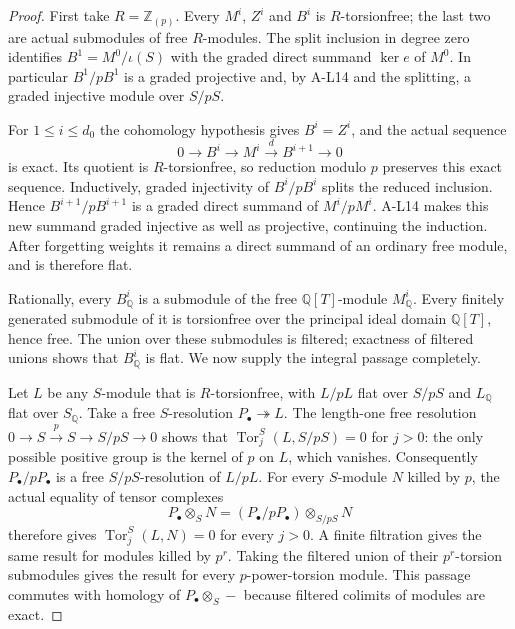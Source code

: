 \begin{proof}
First take $R=\mathbb Z_{(p)}$. Every $M^i$, $Z^i$
and $B^i$ is $R$-torsionfree; the last two are actual
submodules of free $R$-modules. The split inclusion in
degree zero identifies $B^1=M^0/\iota(S)$ with the
graded direct summand $\ker e$ of $M^0$. In particular
$B^1/pB^1$ is a graded projective and, by A-L14 and
the splitting, a graded injective module over $S/pS$.

For $1\leq i\leq d_0$ the cohomology hypothesis gives
$B^i=Z^i$, and the actual sequence
\[
 0\longrightarrow B^i\longrightarrow M^i
       \xrightarrow{d} B^{i+1}\longrightarrow0
 \tag{AL.81}
\]
is exact. Its quotient is $R$-torsionfree, so reduction
modulo $p$ preserves this exact sequence. Inductively,
graded injectivity of $B^i/pB^i$ splits the reduced
inclusion. Hence $B^{i+1}/pB^{i+1}$ is a graded direct
summand of $M^i/pM^i$. A-L14 makes this new summand
graded injective as well as projective, continuing the
induction. After forgetting weights it remains a direct
summand of an ordinary free module, and is therefore flat.

Rationally, every $B^i_{\mathbb Q}$ is a submodule of
the free $\mathbb Q[T]$-module $M^i_{\mathbb Q}$.
Every finitely generated submodule of it is torsionfree
over the principal ideal domain $\mathbb Q[T]$, hence
free. The union over these submodules is filtered;
exactness of filtered unions shows that $B^i_{\mathbb Q}$
is flat. We now supply the integral passage completely.

Let $L$ be any $S$-module that is $R$-torsionfree,
with $L/pL$ flat over $S/pS$ and $L_{\mathbb Q}$ flat
over $S_{\mathbb Q}$. Take a free $S$-resolution
$P_\bullet\twoheadrightarrow L$.
The length-one free resolution
$0\to S\xrightarrow{p}S\to S/pS\to0$ shows that
$\operatorname{Tor}^S_j(L,S/pS)=0$ for $j>0$:
the only possible positive group is the kernel of $p$
on $L$, which vanishes. Consequently
$P_\bullet/pP_\bullet$ is a free $S/pS$-resolution of
$L/pL$. For every $S$-module $N$ killed by $p$, the
actual equality of tensor complexes
\[
 P_\bullet\otimes_S N
 = (P_\bullet/pP_\bullet)\otimes_{S/pS}N
 \tag{AL.82}
\]
therefore gives $\operatorname{Tor}^S_j(L,N)=0$ for
every $j>0$. A finite filtration gives the same result
for modules killed by $p^r$. Taking the filtered union
of their $p^r$-torsion submodules gives the result for
every $p$-power-torsion module. This passage commutes
with homology of $P_\bullet\otimes_S-$ because filtered
colimits of modules are exact.


\end{proof}
